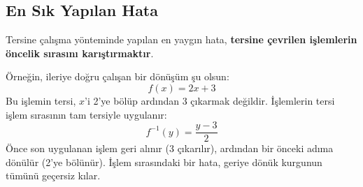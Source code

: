 \subsection*{En Sık Yapılan Hata}

Tersine çalışma yönteminde yapılan en yaygın hata, \textbf{tersine çevrilen işlemlerin öncelik sırasını karıştırmaktır}. 

Örneğin, ileriye doğru çalışan bir dönüşüm şu olsun:
\[
f(x) = 2x + 3
\]
Bu işlemin tersi, $x$'i 2'ye bölüp ardından 3 çıkarmak değildir. İşlemlerin tersi işlem sırasının tam tersiyle uygulanır:
\[
f^{-1}(y) = \frac{y - 3}{2}
\]
Önce son uygulanan işlem geri alınır (3 çıkarılır), ardından bir önceki adıma dönülür (2'ye bölünür). İşlem sırasındaki bir hata, geriye dönük kurgunun tümünü geçersiz kılar.
